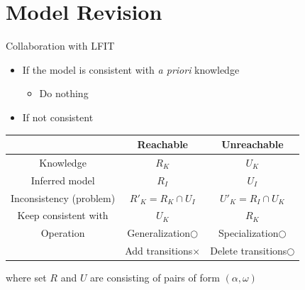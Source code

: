 \documentclass[8pt]{beamer}
\begin{document}
%        
%        
%        
%        
        
\section{Model Revision}
\begin{frame}{Collaboration with LFIT}


\begin{itemize}
    \item If the model is consistent with \textit{a priori} knowledge
    \begin{itemize}
        \item Do nothing
    \end{itemize}
    \item If not consistent
    \end{itemize}
    \begin{table}[t]
        \centering
        \begin{tabular}{c|c|c}
            &Reachable &Unreachable\\
            \hline
            Knowledge& \multicolumn{1}{c}{$R_K$} & \multicolumn{1}{c}{$U_K$} \\
            \hline
            Inferred model& \multicolumn{1}{c}{$R_I$} & \multicolumn{1}{c}{$U_I$}\\
            \hline
            Inconsistency (problem)& $R'_K=R_K\cap U_I$ & $U'_K=R_I\cap U_K$\\
            Keep consistent with& $U_K$& $R_K$\\
            \hline
            Operation &Generalization$\bigcirc$ & Specialization$\bigcirc$\\
            &Add transitions$\times$&Delete transitions$\bigcirc$
        \end{tabular}
    \end{table}
    
    where set $R$ and $U$ are consisting of pairs of form $(\alpha, \omega)$
\end{frame}
\end{document}
